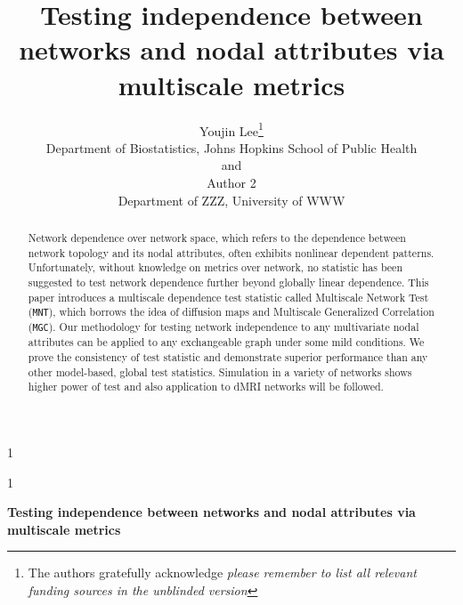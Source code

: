 \documentclass[12pt]{article}
\newcommand{\blind}{1}
\theoremstyle{definition}
\begin{document}
	
	
	\def\spacingset#1{\renewcommand{\baselinestretch}%
		{#1}\small\normalsize} \spacingset{1}
	
	
	
	\blind
	{
		\title{\bf Testing independence between networks and nodal attributes via multiscale metrics}
		\author{Youjin Lee\thanks{
				The authors gratefully acknowledge \textit{please remember to list all relevant funding sources in the unblinded version}}\hspace{.2cm}\\
			Department of Biostatistics, Johns Hopkins School of Public Health\\
			and \\
			Author 2 \\
			Department of ZZZ, University of WWW}
		\maketitle
	} \fi
	
	\blind
	{
		\bigskip
		\bigskip
		\bigskip
		\begin{center}
			{\LARGE\bf Testing independence between networks and nodal attributes via multiscale metrics}
		\end{center}
		\medskip
	} \fi
	
	
\sloppy
\bigskip
\begin{abstract}
		Network dependence over network space, which refers to the dependence between network topology and its nodal attributes, often exhibits nonlinear dependent patterns. Unfortunately, without knowledge on metrics over network, no statistic has been suggested to test network dependence further beyond globally linear dependence. This paper introduces a multiscale dependence test statistic called Multiscale Network Test (\texttt{MNT}), which borrows the idea of diffusion maps and Multiscale Generalized Correlation (\texttt{MGC}). Our methodology for testing network independence to any multivariate nodal attributes can be applied to any exchangeable graph under some mild conditions. We prove the consistency of test statistic and demonstrate superior performance than any other model-based, global test statistics. Simulation in a variety of networks shows higher power of test and also application to dMRI networks will be followed. 
\end{abstract}
	
\end{document}
